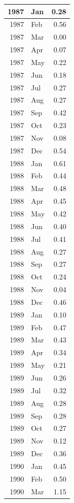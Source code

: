 \documentclass[
]{article}
\begin{document}
\begin{table}[H]
\begin{tabular}[t]{r|l|r}
\hline
1987 & Jan & 0.28\\
\hline
1987 & Feb & 0.56\\
\hline
1987 & Mar & 0.00\\
\hline
1987 & Apr & 0.07\\
\hline
1987 & May & 0.22\\
\hline
1987 & Jun & 0.18\\
\hline
1987 & Jul & 0.27\\
\hline
1987 & Aug & 0.27\\
\hline
1987 & Sep & 0.42\\
\hline
1987 & Oct & 0.23\\
\hline
1987 & Nov & 0.08\\
\hline
1987 & Dec & 0.54\\
\hline
1988 & Jan & 0.61\\
\hline
1988 & Feb & 0.44\\
\hline
1988 & Mar & 0.48\\
\hline
1988 & Apr & 0.45\\
\hline
1988 & May & 0.42\\
\hline
1988 & Jun & 0.40\\
\hline
1988 & Jul & 0.41\\
\hline
1988 & Aug & 0.27\\
\hline
1988 & Sep & 0.27\\
\hline
1988 & Oct & 0.24\\
\hline
1988 & Nov & 0.04\\
\hline
1988 & Dec & 0.46\\
\hline
1989 & Jan & 0.10\\
\hline
1989 & Feb & 0.47\\
\hline
1989 & Mar & 0.43\\
\hline
1989 & Apr & 0.34\\
\hline
1989 & May & 0.21\\
\hline
1989 & Jun & 0.26\\
\hline
1989 & Jul & 0.32\\
\hline
1989 & Aug & 0.28\\
\hline
1989 & Sep & 0.28\\
\hline
1989 & Oct & 0.27\\
\hline
1989 & Nov & 0.12\\
\hline
1989 & Dec & 0.36\\
\hline
1990 & Jan & 0.45\\
\hline
1990 & Feb & 0.50\\
\hline
1990 & Mar & 1.15\\

\end{tabular}
\end{table}
\end{document}
